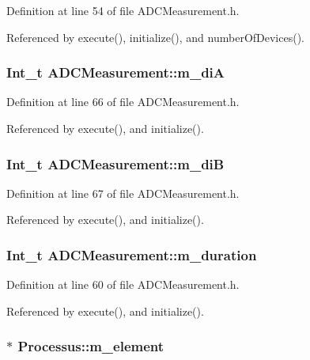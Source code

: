 Definition at line 54 of file ADCMeasurement.h.

Referenced by execute(), initialize(), and numberOfDevices().\hypertarget{classADCMeasurement_ae024ec8553b7ea765af8668ab5e95699}{
\subsubsection[{m\_\-diA}]{\setlength{\rightskip}{0pt plus 5cm}Int\_\-t {\bf ADCMeasurement::m\_\-diA}}}
\label{classADCMeasurement_ae024ec8553b7ea765af8668ab5e95699}


Definition at line 66 of file ADCMeasurement.h.

Referenced by execute(), and initialize().\hypertarget{classADCMeasurement_a9d04a602dda58b9fd65acf4a0a7de9a3}{
\subsubsection[{m\_\-diB}]{\setlength{\rightskip}{0pt plus 5cm}Int\_\-t {\bf ADCMeasurement::m\_\-diB}}}
\label{classADCMeasurement_a9d04a602dda58b9fd65acf4a0a7de9a3}


Definition at line 67 of file ADCMeasurement.h.

Referenced by execute(), and initialize().\hypertarget{classADCMeasurement_a92c0ee7d148bb63de876817f624d1527}{
\subsubsection[{m\_\-duration}]{\setlength{\rightskip}{0pt plus 5cm}Int\_\-t {\bf ADCMeasurement::m\_\-duration}}}
\label{classADCMeasurement_a92c0ee7d148bb63de876817f624d1527}


Definition at line 60 of file ADCMeasurement.h.

Referenced by execute(), and initialize().\hypertarget{classProcessus_aa9d24d53c3e52f36786cabb5d8e296e7}{
\subsubsection[{m\_\-element}]{$\ast$ {\bf Processus::m\_\-element}}}
\label{classProcessus_aa9d24d53c3e52f36786cabb5d8e296e7}



